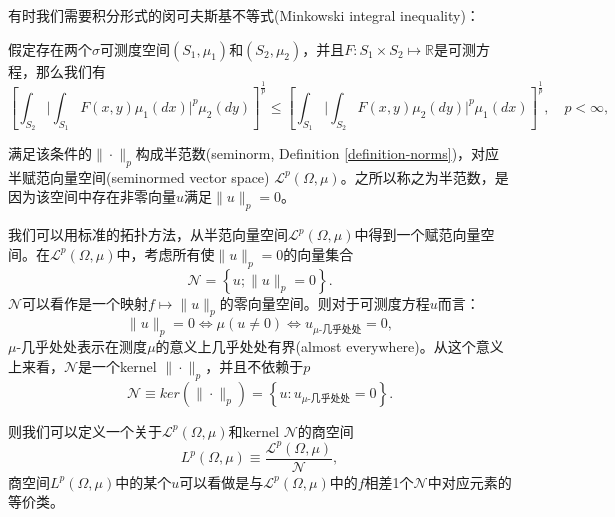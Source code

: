   有时我们需要积分形式的闵可夫斯基不等式(Minkowski integral inequality)：
\begin{definition}[闵可夫斯基积分不等式]
  \label{sec:minkowski-ineq-int-def}
  假定存在两个$\sigma$可测度空间$(S_1, \mu_1)$和$(S_2, \mu_2)$，并且$F:S_1 \times S_2 \mapsto \mathbb{R}$是可测方程，那么我们有
  \begin{equation*}
    \left[ \int_{S_2} \Big| \int_{S_1} F(x,y) \mu_1(d x) \Big|^{p} \mu_2 (d y)\right]^{\frac{1}{p}} \le
    \left[ \int_{S_1} \Big| \int_{S_2} F(x,y) \mu_2(d y) \Big|^{p} \mu_1 (d x)\right]^{\frac{1}{p}}, \quad p < \infty,
  \end{equation*}
\end{definition}

满足该条件的$\| \cdot \|_p$构成半范数(seminorm, Definition \ref{definition-norms})，对应半赋范向量空间(seminormed vector space) $\mathcal{L}^p(\Omega,\mu)$。之所以称之为半范数，是因为该空间中存在非零向量$u$满足$\| u \|_p = 0$。

我们可以用标准的拓扑方法，从半范向量空间$\mathcal{L}^p(\Omega,\mu)$中得到一个赋范向量空间。在$\mathcal{L}^p(\Omega,\mu)$中，考虑所有使$\| u \|_p = 0$的向量集合
\begin{equation*}
  \mathcal{N} = \left\{ u;  \| u \|_p = 0 \right\}.
\end{equation*}
$\mathcal{N}$可以看作是一个映射$f \mapsto \| u \|_p$的零向量空间。则对于可测度方程$u$而言：
\begin{equation*}
  \| u \|_p = 0 \Longleftrightarrow \mu(u \neq 0) \Longleftrightarrow u_{\mu\text{-几乎处处}} = 0,
\end{equation*}
$\mu\text{-几乎处处}$表示在测度$\mu$的意义上几乎处处有界(almost everywhere)。从这个意义上来看，$\mathcal{N}$是一个kernel $\| \cdot \|_p$，并且不依赖于$p$
\begin{equation*}
  \mathcal{N} \equiv ker\left( \| \cdot \|_p \right) = \left\{ u: u _{\mu\text{-几乎处处}}=0 \right\}.
\end{equation*}

则我们可以定义一个关于$\mathcal{L}^p(\Omega,\mu)$和kernel $\mathcal{N}$的商空间
\begin{equation*}
  L^p(\Omega,\mu) \equiv \frac{\mathcal{L}^p (\Omega,\mu)}{\mathcal{N}},
\end{equation*}
商空间$L^p(\Omega,\mu)$中的某个$u$可以看做是与$\mathcal{L}^p(\Omega,\mu)$中的$f$相差1个$\mathcal{N}$中对应元素的等价类。

